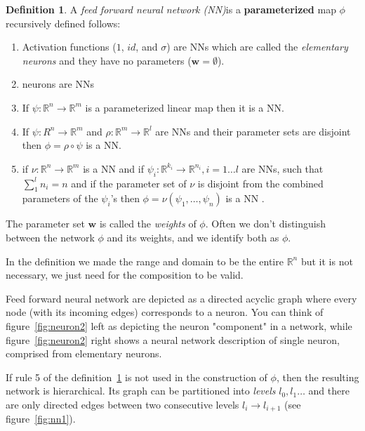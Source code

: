 \documentclass[11pt, a4paper]{report}
\theoremstyle{plain}
\theoremstyle{definition}
\newtheorem{mydef}{Definition}[chapter]
\theoremstyle{remark}
\newcommand{\R}{\mathbb{R}}
\newcommand{\w}{\mathbf{w}}
\begin{document}
\begin{mydef}
\label{def:NN}
A \emph{feed forward neural network (NN)}is a \textbf{parameterized} map $\phi$
recursively defined
follows:
\begin{enumerate}
\item{} 
Activation functions ($1$, $id$, and $\sigma$) are NNs which are called the
\emph{elementary neurons} and they have no parameters ($\w=\emptyset$).
\item{} neurons are NNs
\item{} If $\psi :\R^n \to \R^m$ is a parameterized linear map then it is a NN.
\item{} If $\psi : R^n \to \R^m$
and $\rho: \R^m \to \R^l$ are NNs and their parameter sets are disjoint then $\phi = \rho
\circ \psi$ is a NN.
\item{} if $\nu:\R^n \to \R^m$ is a NN
and if $\psi_i: \R^{k_i} \to \R^{n_i}, i =1 \dots l$ are NNs, such that
$\sum_1^l n_i = n$
and if the parameter set of $\nu$ is disjoint from the combined parameters of
the $\psi_i$'s then
$\phi = \nu(\psi_1, \dots, \psi_n)$ is a NN
.
\end{enumerate}

The parameter set $\w$ is called the \emph{weights} of $\phi$. Often we don't
distinguish between the network $\phi$ and its weights, and we identify both as
$\phi$.

In the definition we made the range and domain to be the entire $\R^n$ but it is
not necessary, we just need for the composition to be valid.
\end{mydef}

Feed forward neural network are depicted as a directed acyclic graph where every
node (with its incoming edges) corresponds to a neuron. You can think of
figure~\ref{fig:neuron2} left as depicting the neuron "component" in a network,
while figure~\ref{fig:neuron2} right shows a neural network description of
single neuron, comprised from elementary neurons.

If rule 5 of the definition~\ref{def:NN} is not used in the construction of
$\phi$, then the resulting network is hierarchical. Its graph can be partitioned
into \emph{levels} $l_0, l_1\dots$ and there are only directed edges between two
consecutive levels $l_i \to l_{i+1}$ (see figure~\ref{fig:nn1}).
\end{document}
